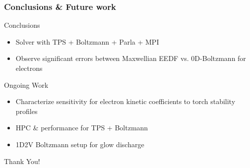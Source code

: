 \documentclass[mathserif, aspectratio=169]{beamer}
\begin{document}
\begin{frame}
	\frametitle{Conclusions \& Future work}
	Conclusions
	\begin{itemize}
		\item Solver with TPS + Boltzmann + Parla + MPI 
		\item Observe significant errors between Maxwellian EEDF vs. 0D-Boltzmann for electrons
	\end{itemize}
	\vspace{0.125in}
	Ongoing Work
	\begin{itemize}
		\item Characterize sensitivity for electron kinetic coefficients to torch stability profiles
		\item HPC \& performance for TPS + Boltzmann
		\item 1D2V Boltzmann setup for glow discharge
	\end{itemize}
	\pause
	\begin{center}
		Thank You!
	\end{center}
\end{frame}
\end{document}
